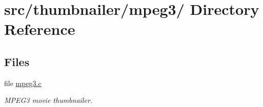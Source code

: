 \hypertarget{dir_000033}{
\section{src/thumbnailer/mpeg3/ Directory Reference}
\label{dir_000033}
}
\subsection*{Files}
\begin{CompactItemize}
\item 
file \hyperlink{mpeg3_8c}{mpeg3.c}
\begin{CompactList}\small\item\em MPEG3 movie thumbnailer. \item\end{CompactList}

\end{CompactItemize}
